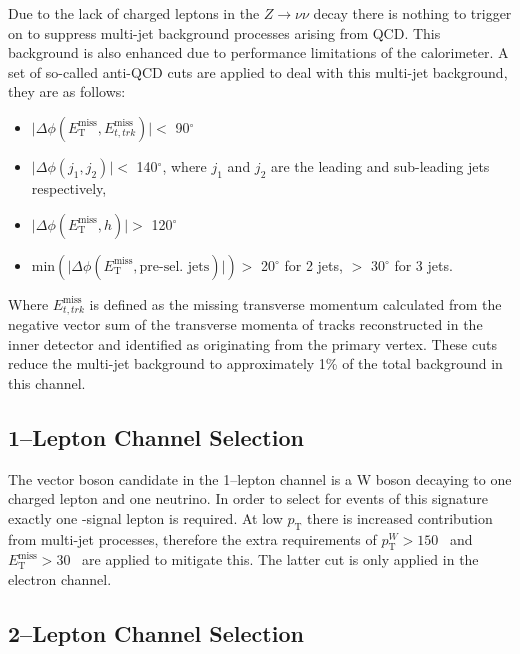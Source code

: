 Due to the lack of charged leptons in the $Z \rightarrow \nu\nu$ decay there is
nothing to trigger on to suppress multi-jet background processes arising from
QCD. This background is also enhanced due to performance limitations of the
calorimeter. A set of so-called anti-QCD cuts are applied to deal with this
multi-jet background, they are as follows:
\begin{itemize}
\item $\lvert \Delta \phi ( E_{\mathrm{T}}^{\text{miss}} , E_{t,
trk}^{\text{miss}} ) \rvert <$ 90$^\circ$
\item $\lvert \Delta \phi ( j_1 , j_2 ) \rvert <$ 140$^\circ$, where $j_1$ and
$j_2$ are the leading and sub-leading jets respectively,
\item $\lvert \Delta \phi ( E_{\mathrm{T}}^{\text{miss}} , h ) \rvert >$
  120$^\circ$
  
\item $\text{min} ( \lvert \Delta \phi ( E_{\mathrm{T}}^{\text{miss}} ,
\text{pre-sel. jets}) \rvert ) >$ 20$^\circ$ for 2 jets, $>$ 30$^\circ$ for 3
jets.
\end{itemize} Where $E_{t, trk}^{\text{miss}}$ is defined as the missing
transverse momentum calculated from the negative vector sum of the transverse
momenta of tracks reconstructed in the inner detector and identified as
originating from the primary vertex. These cuts reduce the multi-jet background
to approximately 1\% of the total background in this channel.

\subsection{1--Lepton Channel Selection}
\label{sec:1lep-selection}

The vector boson candidate in the 1--lepton channel is a W boson decaying to one
charged lepton and one neutrino. In order to select for events of this signature
exactly one \WH-signal lepton is required. At low $p_{\mathrm{T}}$ there is
increased contribution from multi-jet processes, therefore the extra
requirements of $p_{\mathrm{T}}^{W} > 150$ \GeV\ and
$E_{\mathrm{T}}^{\text{miss}} > 30$ \GeV\ are applied to mitigate this. The
latter cut is only applied in the electron channel.

\subsection{2--Lepton Channel Selection}
\label{sec:2lep-selection}

